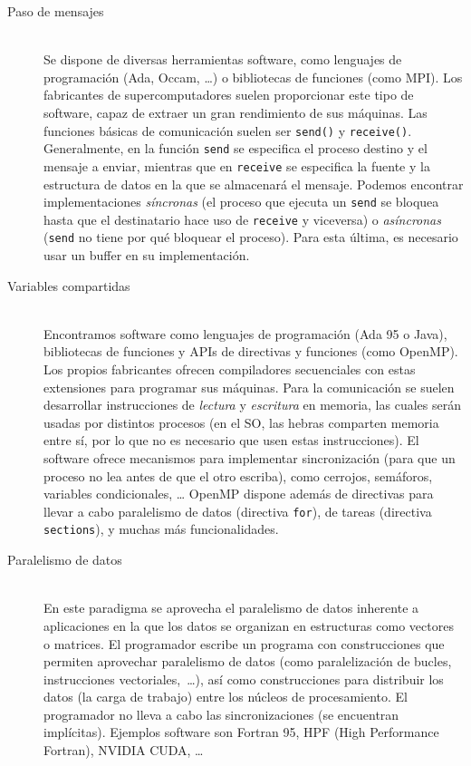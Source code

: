 \begin{description}
    \item [Paso de mensajes]~\\
        Se dispone de diversas herramientas software, como lenguajes de programación (Ada, Occam, \ldots) o bibliotecas de funciones (como MPI). Los fabricantes de supercomputadores suelen proporcionar este tipo de software, capaz de extraer un gran rendimiento de sus máquinas. Las funciones básicas de comunicación suelen ser \verb|send()| y \verb|receive()|. Generalmente, en la función \verb|send| se especifica el proceso destino y el mensaje a enviar, mientras que en \verb|receive| se especifica la fuente y la estructura de datos en la que se almacenará el mensaje. Podemos encontrar implementaciones \emph{síncronas} (el proceso que ejecuta un \verb|send| se bloquea hasta que el destinatario hace uso de \verb|receive| y viceversa) o \emph{asíncronas} (\verb|send| no tiene por qué bloquear el proceso). Para esta última, es necesario usar un buffer en su implementación. 
    \item [Variables compartidas]~\\
        Encontramos software como lenguajes de programación (Ada 95 o Java), bibliotecas de funciones y APIs de directivas y funciones (como OpenMP). Los propios fabricantes ofrecen compiladores secuenciales con estas extensiones para programar sus máquinas. Para la comunicación se suelen desarrollar instrucciones de \emph{lectura} y \emph{escritura} en memoria, las cuales serán usadas por distintos procesos (en el SO, las hebras comparten memoria entre sí, por lo que no es necesario que usen estas instrucciones). El software ofrece mecanismos para implementar sincronización (para que un proceso no lea antes de que el otro escriba), como cerrojos, semáforos, variables condicionales, \ldots 
        OpenMP dispone además de directivas para llevar a cabo paralelismo de datos (directiva \verb|for|), de tareas (directiva \verb|sections|), y muchas más funcionalidades. 
    \item [Paralelismo de datos]~\\
        En este paradigma se aprovecha el paralelismo de datos inherente a aplicaciones en la que los datos se organizan en estructuras como vectores o matrices. El programador escribe un programa con construcciones que permiten aprovechar paralelismo de datos (como paralelización de bucles, instrucciones vectoriales,~\ldots), así como construcciones para distribuir los datos (la carga de trabajo) entre los núcleos de procesamiento. El programador no lleva a cabo las sincronizaciones (se encuentran implícitas). Ejemplos software son Fortran 95, HPF (High Performance Fortran), NVIDIA CUDA, \ldots
\end{description}

